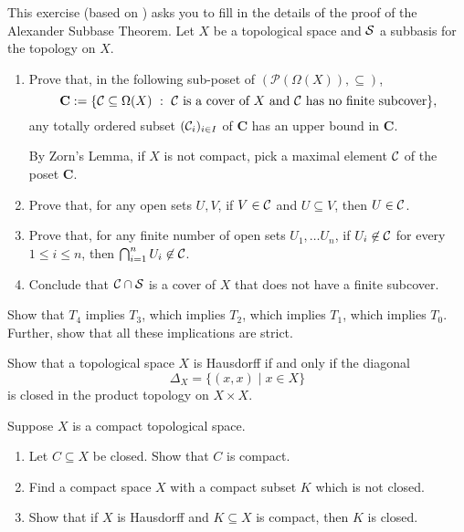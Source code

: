 \begin{exercise}\label{exer:alexander}
  This exercise (based on \cite[Exercise~3.12.2, p.~221]{Engelking89}) asks you to fill in the details of the proof of the Alexander Subbase Theorem. 
  Let $X$ be a topological space and $\mathcal{S}$ a subbasis for the topology on $X$.
  \begin{enumerate}
  \item Prove that, in the following sub-poset of $(\mathcal{P}(\Omega(X)), \subseteq)$, 
    \[\mathbf{C} := \{ \cC \subseteq \Omega(X) \ : \ \cC \text{ is a cover of } X \text{ and } \cC \text{ has no finite subcover}\},\] any totally ordered subset $(\mathcal{C}_i)_{i \in I}$ of $\mathbf{C}$ has an upper bound in $\mathbf{C}$. 

    By Zorn's Lemma, if $X$ is not compact, pick a maximal element $\mathcal{C}$ of the poset $\mathbf{C}$.
    \item Prove that, for any open sets $U, V$, if $V \in \mathcal{C}$ and $U \subseteq V$, then $U \in \mathcal{C}$.

    \item Prove that, for any finite number of open sets $U_1, \dots U_n$, if $U_i \not\in \mathcal{C}$ for every $1 \leq i \leq n$, then $\bigcap_{i=1}^n U_i \not\in \mathcal{C}$. 
      \item Conclude that $\mathcal{C} \cap \mathcal{S}$ is a cover of $X$ that does not have a finite subcover.
  \end{enumerate}
\end{exercise}


\begin{exercise}\label{exer:sep}
Show that $T_4$ implies $T_3$, which implies $T_2$, which implies $T_1$, which implies $T_0$. Further, show that all these implications are strict.
\end{exercise}

\begin{exercise}\label{exer:Hausdorff}
Show that a topological space $X$ is Hausdorff if and only if the diagonal
\[
\Delta_X=\{(x,x)\mid x\in X\}
\]
is closed in the product topology on $X\times X$.
\end{exercise}


\begin{exercise}\label{exer:comp}
Suppose $X$ is a compact topological space.
\begin{enumerate}
\item Let $C\subseteq X$ be closed. Show that $C$ is compact.
\item Find a compact space $X$ with a compact subset $K$ which is not closed.
\item Show that if $X$ is Hausdorff and $K\subseteq X$ is compact, then $K$ is closed.
\end{enumerate}
\end{exercise}


